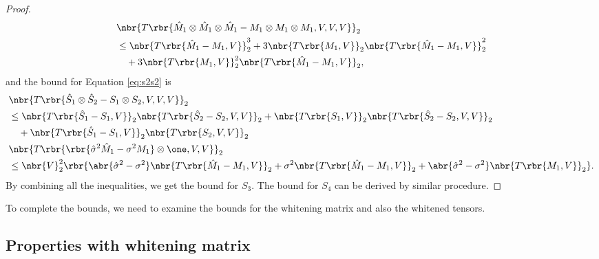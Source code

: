 \documentclass[twoside,11pt]{article}
\begin{document}
{\begin{proof}
  \begin{align}
    &\nbr{ T\rbr{ \hat{M}_1 \otimes \hat{M}_1 \otimes \hat{M}_1 - M_1 \otimes M_1 \otimes M_1,V,V,V} }_2 \nonumber\\
    & \leq \nbr{T\rbr{\hat{M}_1-M_1,V}}_2^3 +3 \nbr{T\rbr{M_1,V}}_2\nbr{T\rbr{\hat{M}_1-M_1,V}}_2^2 \nonumber\\
    &\,\,\,\,\,\,+ 3 \nbr{T\rbr{M_1,V}}_2^2\nbr{T\rbr{\hat{M}_1-M_1,V}}_2,
    \end{align}
    and the bound for Equation \eqref{eq:s2s2} is
    \begin{align}
    & \nbr{T\rbr{\hat{S}_1\otimes \hat{S}_2-S_1 \otimes S_2, V,V,V} }_2 \nonumber\\
    &\leq  \nbr{T\rbr{ \hat{S}_1-S_1,V  }}_2  \nbr{T\rbr{ \hat{S}_2-S_2 ,V,V  }}_2 +  \nbr{T\rbr{ S_1,V  }}_2  \nbr{T\rbr{ \hat{S}_2-S_2 ,V,V  }}_2 \nonumber\\
    &\,\,\,\,\,\,+ \nbr{T\rbr{ \hat{S}_1-S_1 ,V  }}_2  \nbr{T\rbr{ S_2 ,V,V  }}_2\\
    & \nbr{T\rbr{\rbr{\hat{\sigma}^2\hat{M}_1 - \sigma^2M_1} \otimes \one,V,V}}_2 \nonumber\\
    &\leq  \nbr{V}_2^2  \rbr{ \abr{\hat{\sigma}^2-\sigma^2} \nbr{T\rbr{\hat{M}_1-M_1,V}}_2 +\sigma^2\nbr{T\rbr{\hat{M}_1-M_1,V}}_2 + \abr{\hat{\sigma}^2-\sigma^2} \nbr{T\rbr{M_1,V}}_2 }.
  \end{align}
By combining all the inequalities, we get the bound for $S_3$. The bound for $S_4$ can be derived by similar procedure. 
\end{proof}
To complete the bounds, we need to examine the bounds for the whitening matrix and also the whitened tensors.

\subsection{Properties with whitening matrix}
\label{app:whiten}

}
\end{document}
